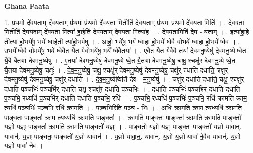 \documentclass[17pt]{extarticle}
\begin{document}
\textbf{Ghana Paata } \newline

1. प्र॒थ॒मो दे॑वय॒ताम् दे॑वय॒ताम् प्र॑थ॒मः प्र॑थ॒मो दे॑वय॒ता मितीति॑ देवय॒ताम् प्र॑थ॒मः प्र॑थ॒मो दे॑वय॒ता मिति॑ । . दे॒व॒य॒ता मितीति॑ देवय॒ताम् दे॑वय॒ता मित्या॑ हा॒हेति॑ देवय॒ताम् दे॑वय॒ता मित्या॑ह । . दे॒व॒य॒तामिति॑ देव - य॒ताम् । . इत्या॑हा॒हे तीत्या॑ हो॒भये॑षू॒ भये᳚ ष्वा॒हेती त्या॑हो॒भये॑षु । . आ॒हो॒ भये॑षू॒ भये᳚ ष्वाहा हो॒भये᳚ ष्वे॒वै वोभये᳚ ष्वाहा हो॒भये᳚ ष्वे॒व । . उ॒भये᳚ ष्वे॒वै वोभये॑षू॒ भये᳚ ष्वे॒वैत यै॒त यै॒वोभये॑षू॒ भये᳚ ष्वे॒वैतया᳚ । . ए॒वैत यै॒त यै॒वैवै तया॑ देवमनु॒ष्येषु॑ देवमनु॒ष्ये ष्वे॒त यै॒वै वैतया॑ देवमनु॒ष्येषु॑ । . ए॒तया॑ देवमनु॒ष्येषु॑ देवमनु॒ष्ये ष्वे॒त यै॒तया॑ देवमनु॒ष्येषु॒ चक्षु॒ श्चक्षु॑र् देवमनु॒ष्ये ष्वे॒त यै॒तया॑ देवमनु॒ष्येषु॒ चक्षुः॑ । . दे॒व॒म॒नु॒ष्येषु॒ चक्षु॒ श्चक्षु॑र् देवमनु॒ष्येषु॑ देवमनु॒ष्येषु॒ चक्षु॑र् दधाति दधाति॒ चक्षु॑र् देवमनु॒ष्येषु॑ देवमनु॒ष्येषु॒ चक्षु॑र् दधाति । . दे॒व॒म॒नु॒ष्येष्विति॑ देव - म॒नु॒ष्येषु॑ । . चक्षु॑र् दधाति दधाति॒ चक्षु॒ श्चक्षु॑र् दधाति प॒ञ्चभिः॑ प॒ञ्चभि॑र् दधाति॒ चक्षु॒ श्चक्षु॑र् दधाति प॒ञ्चभिः॑ । . द॒धा॒ति॒ प॒ञ्चभिः॑ प॒ञ्चभि॑र् दधाति दधाति प॒ञ्चभि॒ रध्यधि॑ प॒ञ्चभि॑र् दधाति दधाति प॒ञ्चभि॒ रधि॑ । . प॒ञ्चभि॒ रध्यधि॑ प॒ञ्चभिः॑ प॒ञ्चभि॒ रधि॑ क्रामति क्राम॒ त्यधि॑ प॒ञ्चभिः॑ प॒ञ्चभि॒ रधि॑ क्रामति । . प॒ञ्चभि॒रिति॑ प॒ञ्च - भिः॒ । . अधि॑ क्रामति क्राम॒ त्यध्यधि॑ क्रामति॒ पाङ्क्तः॒ पाङ्क्तः॑ क्राम॒ त्यध्यधि॑ क्रामति॒ पाङ्क्तः॑ । . क्रा॒म॒ति॒ पाङ्क्तः॒ पाङ्क्तः॑ क्रामति क्रामति॒ पाङ्क्तो॑ य॒ज्ञो य॒ज्ञ्ः पाङ्क्तः॑ क्रामति क्रामति॒ पाङ्क्तो॑ य॒ज्ञ्ः । . पाङ्क्तो॑ य॒ज्ञो य॒ज्ञ्ः पाङ्क्तः॒ पाङ्क्तो॑ य॒ज्ञो यावा॒न्॒. यावान्॑. य॒ज्ञ्ः पाङ्क्तः॒ पाङ्क्तो॑ य॒ज्ञो यावान्॑ । . य॒ज्ञो यावा॒न्॒. यावान्॑. य॒ज्ञो य॒ज्ञो यावा॑ ने॒वैव यावान्॑. य॒ज्ञो य॒ज्ञो यावा॑ ने॒व । \newline
\end{document}

